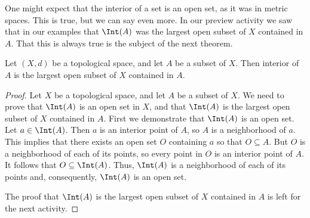 \begin{comment}
Finally, we will prove that $\Int(A)\cap \Int(B) = \Int(A \cap B)$. Let $x \in \Int(A) \cap \Int(B) $. Then $x \in \Int(A)$ and $x \in \Int(B)$. So there exist open sets $O_A$ in $A$ and $O_B$ in $B$ such that $x \in O_A$ and $x \in O_B$. From this we have that $O = O_A \cap O_B$ is an open set contained in $A \cap B$ and $x \in O$. Thus, $x \in \Int(A \cap B)$. So $\Int(A)\cap \Int(B) \subseteq  \Int(A \cap B)$.

Now suppose that $x \in \Int(A \cap B)$. Then there is an open set $O$ in $A \cap B$ with $x \in O$. But $O \subseteq A$ and $O \subseteq B$, so $x \in \Int(A)$ and $x \in \Int(B)$. It follows that $x \in \Int(A) \cap \Int(B)$. So $\Int(A \cap B) \subseteq  \Int(A)\cap \Int(B)$. These two inclusions show that  $\Int(A \cap B) = \Int(A)\cap \Int(B)$.

\ee

\end{comment}

\label{sec_inter_set_top}

One might expect that the interior of a set is an open set, as it was in metric spaces. This is true, but we can say even more. In our preview activity we saw that in our examples that $\Int(A)$ was the largest open subset of $X$ contained in $A$. That this is always true is the subject of the next theorem. 

\begin{theorem} \label{thm:Interior} Let $(X,d)$ be a topological space, and let $A$ be a subset of $X$. Then interior of $A$ is the largest open subset of $X$ contained in $A$.  
\end{theorem}

\begin{proof} Let $X$ be a topological space, and let $A$ be a subset of $X$. We need to prove that $\Int(A)$ is an open set in $X$, and that $\Int(A)$ is the largest open subset of $X$ contained in $A$. First we demonstrate that $\Int(A)$ is an open set. Let $a \in \Int(A)$. Then $a$ is an interior point of $A$, so $A$ is a neighborhood of $a$. This implies that there exists an open set $O$ containing $a$ so that $O \subseteq A$. But $O$ is a neighborhood of each of its points, so every point in $O$ is an interior point of $A$. It follows that $O \subseteq \Int(A)$. Thus, $\Int(A)$ is a neighborhood of each of its points and, consequently, $\Int(A)$ is an open set. 

The proof that $\Int(A)$ is the largest open subset of $X$ contained in $A$ is left for the next activity.
\end{proof}

